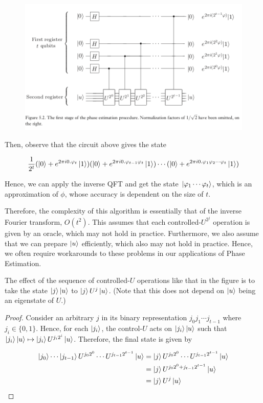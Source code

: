 \documentclass[main.tex]{subfiles}
\begin{document}
\begin{figure}[H]
\centering
\includegraphics[width=\linewidth]{images/phase_estim.png}
\end{figure}

Then, observe that the circuit above gives the state

\begin{align*}
\frac{1}{2^t}(\ket{0} + e^{2 \pi i 0.\varphi_t}\ket{1})(\ket{0} + e^{2 \pi i 0.\varphi_{t-1}\varphi_t}\ket{1})	\cdots (\ket{0} + e^{2 \pi i 0.\varphi_1\varphi_2\cdots\varphi_t}\ket{1})
\end{align*}

Hence, we can apply the inverse QFT and get the state $\ket{\varphi_1 \cdots \varphi_t}$, which is an approximation of $\phi$, whose accuracy is dependent on the size of $t$.

Therefore, the complexity of this algorithm is essentially that of the inverse Fourier transform, $O(t^2)$. This assumes that each controlled-$U^{2^j}$ operation is given by an oracle, which may not hold in practice. Furthermore, we also assume that we can prepare $\ket{u}$ efficiently, which also may not hold in practice. Hence, we often require workarounds to these problems in our applications of Phase Estimation.

\begin{example} The effect of the sequence of controlled-$U$ operations like that in the figure is to take the state $\ket{j}\ket{u}$ to $\ket{j} U^j\ket{u}$. (Note that this does not depend on $\ket{u}$ being an eigenstate of $U$.)
\begin{proof}
	Consider an arbitrary $j$ in its binary representation $j_0j_1 \cdots j_{t-1}$ where $j_i \in \{ 0, 1\}$. Hence, for each $\ket{j_i}$, the control-$U$ acts on $\ket{j_i}\ket{u}$ such that $\ket{j_i}\ket{u} \mapsto \ket{j_i}U^{j_i 2^i}\ket{u}$. Therefore, the final state is given by

	\begin{align*}
	\ket{j_0 } \cdots \ket{j_{t-1}}U^{j_0 2^0} \cdots U^{j_{t-1} 2^{t-1}}\ket{u} &= \ket{j} U^{j_0 2^0} \cdots U^{j_{t-1} 2^{t-1}}\ket{u} \\
	&= \ket{j} U^{j_0 2^0 + j_{t-1} 2^{t-1}}\ket{u} \\
	&= \ket{j} U^{j}\ket{u}
	\end{align*}
\end{proof}
\end{example}
\end{document}
